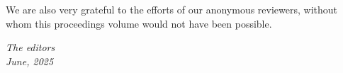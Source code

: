 We are also very grateful to the efforts of our anonymous reviewers, without whom this proceedings volume would not have been possible.
\vspace{1cm}

\noindent \textit{The editors} \\
\textit{June, 2025}




